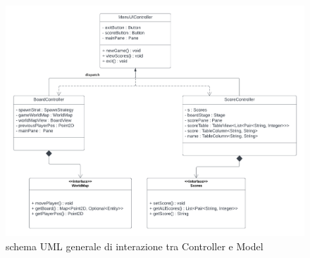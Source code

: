 \documentclass[a4paper,12pt]{report}
\begin{document}
\begin{figure}[H]
\centering{}
\includegraphics[width=\textwidth,height=\textheight,keepaspectratio]{img/controller_model.pdf}
\caption{schema UML generale di interazione tra Controller e Model}
\label{img:controller-model}
\end{figure}
\end{document}
